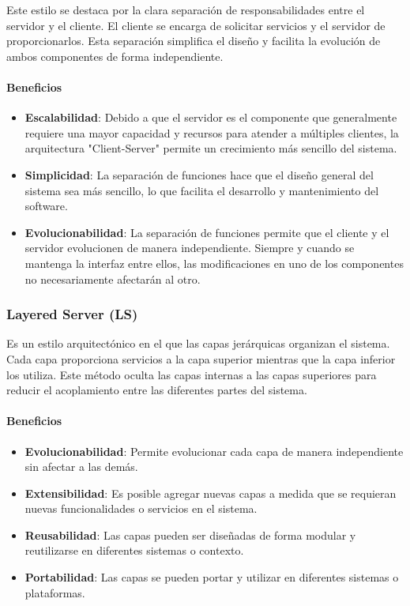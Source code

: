 \documentclass{article}
\begin{document}
		 Este estilo se destaca por la clara separación de responsabilidades entre el servidor y el cliente. El cliente se encarga de solicitar servicios y el servidor de proporcionarlos. Esta separación simplifica el diseño y facilita la evolución de ambos componentes de forma independiente.
		
		\paragraph{Beneficios}
		\begin{itemize}	
			\item {\textbf{Escalabilidad}}: Debido a que el servidor es el componente que generalmente requiere una mayor capacidad y recursos para atender a múltiples clientes, la arquitectura "Client-Server" permite un crecimiento más sencillo del sistema.
			
			\item {\textbf{Simplicidad}}: La separación de funciones hace que el diseño general del sistema sea más sencillo, lo que facilita el desarrollo y mantenimiento del software.
			
			\item {\textbf{Evolucionabilidad}}: La separación de funciones permite que el cliente y el servidor evolucionen de manera independiente. Siempre y cuando se mantenga la interfaz entre ellos, las modificaciones en uno de los componentes no necesariamente afectarán al otro.
			
		\end{itemize}
		
		\subsubsection{Layered Server (LS)}
		Es un estilo arquitectónico en el que las capas jerárquicas organizan el sistema. Cada capa proporciona servicios a la capa superior mientras que la capa inferior los utiliza. Este método oculta las capas internas a las capas superiores para reducir el acoplamiento entre las diferentes partes del sistema.
 		\paragraph{Beneficios}
		\begin{itemize}	
			\item {\textbf{Evolucionabilidad}}: Permite evolucionar cada capa de manera independiente sin afectar a las demás.
			
			\item {\textbf{Extensibilidad}}: Es posible agregar nuevas capas a medida que se requieran nuevas funcionalidades o servicios en el sistema.
			
			\item {\textbf{Reusabilidad}}: Las capas pueden ser diseñadas de forma modular y reutilizarse en diferentes sistemas o contexto.
			
			\item {\textbf{Portabilidad}}: Las capas se pueden portar y utilizar en diferentes sistemas o plataformas.
		\end{itemize}
		
\end{document}
